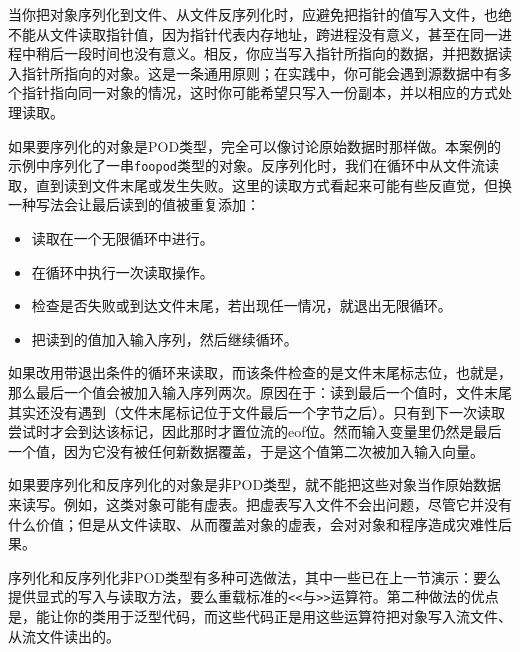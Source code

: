 
当你把对象序列化到文件、从文件反序列化时，应避免把指针的值写入文件，也绝不能从文件读取指针值，因为指针代表内存地址，跨进程没有意义，甚至在同一进程中稍后一段时间也没有意义。相反，你应当写入指针所指向的数据，并把数据读入指针所指向的对象。这是一条通用原则；在实践中，你可能会遇到源数据中有多个指针指向同一对象的情况，这时你可能希望只写入一份副本，并以相应的方式处理读取。



如果要序列化的对象是POD类型，完全可以像讨论原始数据时那样做。本案例的示例中序列化了一串\texttt{foopod}类型的对象。反序列化时，我们在循环中从文件流读取，直到读到文件末尾或发生失败。这里的读取方式看起来可能有些反直觉，但换一种写法会让最后读到的值被重复添加：



\begin{itemize}
\item 读取在一个无限循环中进行。



\item 在循环中执行一次读取操作。



\item 检查是否失败或到达文件末尾，若出现任一情况，就退出无限循环。



\item 把读到的值加入输入序列，然后继续循环。

\end{itemize}



如果改用带退出条件的循环来读取，而该条件检查的是文件末尾标志位，也就是，那么最后一个值会被加入输入序列两次。原因在于：读到最后一个值时，文件末尾其实还没有遇到（文件末尾标记位于文件最后一个字节之后）。只有到下一次读取尝试时才会到达该标记，因此那时才置位流的eof位。然而输入变量里仍然是最后一个值，因为它没有被任何新数据覆盖，于是这个值第二次被加入输入向量。



如果要序列化和反序列化的对象是非POD类型，就不能把这些对象当作原始数据来读写。例如，这类对象可能有虚表。把虚表写入文件不会出问题，尽管它并没有什么价值；但是从文件读取、从而覆盖对象的虚表，会对对象和程序造成灾难性后果。



序列化和反序列化非POD类型有多种可选做法，其中一些已在上一节演示：要么提供显式的写入与读取方法，要么重载标准的\texttt{<<}与\texttt{>>}运算符。第二种做法的优点是，能让你的类用于泛型代码，而这些代码正是用这些运算符把对象写入流文件、从流文件读出的。



